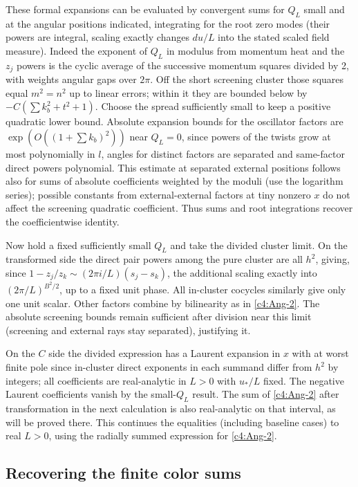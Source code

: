 These formal expansions can be evaluated by convergent sums for \(Q_L\) small and at the angular positions indicated, integrating for the root zero modes (their powers are integral, scaling exactly changes \(du/L\) into the stated scaled field measure). Indeed the exponent of \(Q_L\) in modulus from momentum heat and the \(z_j\) powers is the cyclic average of the successive momentum squares divided by 2, with weights angular gaps over \(2\pi\). Off the short screening cluster those squares equal \(m^2=n^2\) up to linear errors; within it they are bounded below by \(-C(\sum k_b^2+t^2+1)\). Choose the spread sufficiently small to keep a positive quadratic lower bound. Absolute expansion bounds for the oscillator factors are \(\exp(O((1+\sum k_b)^2))\) near \(Q_L=0\), since powers of the twists grow at most polynomially in \(l\), angles for distinct factors are separated and same-factor direct powers polynomial. This estimate at separated external positions follows also for sums of absolute coefficients weighted by the moduli (use the logarithm series); possible constants from external-external factors at tiny nonzero \(x\) do not affect the screening quadratic coefficient. Thus sums and root integrations recover the coefficientwise identity.

Now hold a fixed sufficiently small \(Q_L\) and take the divided cluster limit. On the transformed side the direct pair powers among the pure cluster are all \(h^2\), giving, since \(1-z_j/z_k\sim(2\pi i/L)(s_j-s_k)\), the additional scaling exactly into \((2\pi/L)^{B^2/2}\), up to a fixed unit phase. All in-cluster cocycles similarly give only one unit scalar. Other factors combine by bilinearity as in \eqref{c4:Ang-2}. The absolute screening bounds remain sufficient after division near this limit (screening and external rays stay separated), justifying it.

On the \(C\) side the divided expression has a Laurent expansion in \(x\) with at worst finite pole since in-cluster direct exponents in each summand differ from \(h^2\) by integers; all coefficients are real-analytic in \(L>0\) with \(u_*/L\) fixed. The negative Laurent coefficients vanish by the small-\(Q_L\) result. The sum of \eqref{c4:Ang-2} after transformation in the next calculation is also real-analytic on that interval, as will be proved there. This continues the equalities (including baseline cases) to real \(L>0\), using the radially summed expression for \eqref{c4:Ang-2}.

\subsection{Recovering the finite color sums}

